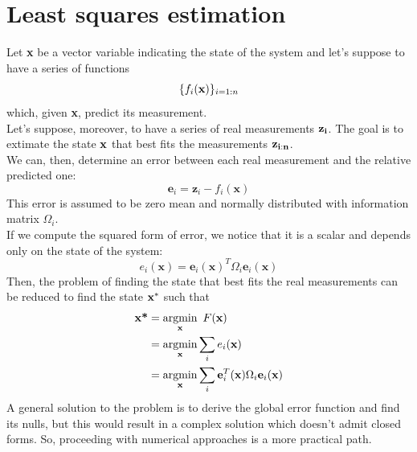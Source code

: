 \documentclass[a4paper, onecolumn]{report}
\begin{document}
\section{Least squares estimation}
Let \textbf{x} be a vector variable indicating the state of the system and let's suppose to have a series of  functions 
\begin{equation}
	\{f_i(\textbf{x})\}_{i = 1:n} \notag
\end{equation}
which, given \textbf{x}, predict its measurement. \\Let's suppose, moreover, to have a series of real measurements ${\bf z_i}$. The goal is to extimate the state ${\bf x}$ that best fits the measurements ${\bf z_{i:n}}$.\\
We can, then, determine an error between each real measurement and the relative predicted one:
\begin{equation}
	\textbf{e}_i = \textbf{z}_i - f_i(\textbf{x})
\end{equation}
This error is assumed to be zero mean and normally distributed with information matrix \textbf{$\Omega_i$}. \\
If we compute the squared form of error, we notice that it is a scalar and depends only on the state of the system:
\begin{equation}
	e_i(\textbf{x}) = \textbf{e}_i(\textbf{x})^T\Omega_i\textbf{e}_i(\textbf{x})
\end{equation}
Then, the problem of finding the state that best fits the real measurements can be reduced to find the state ${\bf x^*}$ such that
\begin{align}
	\textbf{x*} &= \underset{\textbf{x}}{\mbox{argmin}} \enspace F(\textbf{x}) \\ \notag
	&= \underset{\textbf{x}}{\mbox{argmin}} \sum_i e_i(\textbf{x}) \\ 
	&= \underset{\textbf{x}}{\mbox{argmin}} \sum_i  \textbf{e}_i^T(\textbf{x})\Omega_i\textbf{e}_i(\textbf{x}) \notag
\end{align}
A general solution to the problem is to derive the global error function and find its nulls, but this would result in a complex solution which doesn't admit closed forms. So, proceeding with numerical approaches is a more practical path. 
\end{document}
